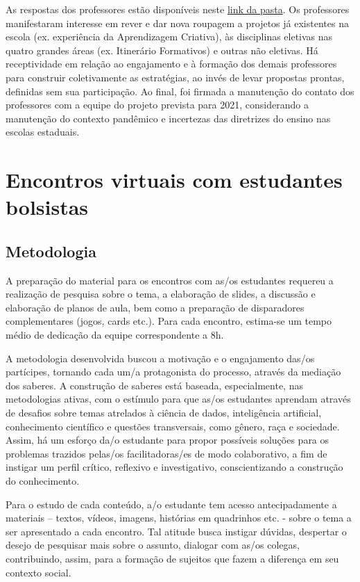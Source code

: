 \documentclass[
]{book}
\begin{document}
As respostas dos professores estão disponíveis neste \href{https://pad.riseup.net/p/CDnaEP}{link da pasta}.
Os professores manifestaram interesse em rever e dar nova roupagem a projetos já existentes na escola (ex. experiência da Aprendizagem Criativa), às disciplinas eletivas nas quatro grandes áreas (ex. Itinerário Formativos) e outras não eletivas. Há receptividade em relação ao engajamento e à formação dos demais professores para construir coletivamente as estratégias, ao invés de levar propostas prontas, definidas sem sua participação.
Ao final, foi firmada a manutenção do contato dos professores com a equipe do projeto prevista para 2021, considerando a manutenção do contexto pandêmico e incertezas das diretrizes do ensino nas escolas estaduais.

\hypertarget{encontros-virtuais-com-estudantes-bolsistas}{%
\chapter{Encontros virtuais com estudantes bolsistas}\label{encontros-virtuais-com-estudantes-bolsistas}}

\hypertarget{metodologia}{%
\section{Metodologia}\label{metodologia}}

A preparação do material para os encontros com as/os estudantes requereu a realização de pesquisa sobre o tema, a elaboração de slides, a discussão e elaboração de planos de aula, bem como a preparação de disparadores complementares (jogos, cards etc.). Para cada encontro, estima-se um tempo médio de dedicação da equipe correspondente a 8h.

A metodologia desenvolvida buscou a motivação e o engajamento das/os partícipes, tornando cada um/a protagonista do processo, através da mediação dos saberes. A construção de saberes está baseada, especialmente, nas metodologias ativas, com o estímulo para que as/os estudantes aprendam através de desafios sobre temas atrelados à ciência de dados, inteligência artificial, conhecimento científico e questões transversais, como gênero, raça e sociedade. Assim, há um esforço da/o estudante para propor possíveis soluções para os problemas trazidos pelas/os facilitadoras/es de modo colaborativo, a fim de instigar um perfil crítico, reflexivo e investigativo, conscientizando a construção do conhecimento.

Para o estudo de cada conteúdo, a/o estudante tem acesso antecipadamente a materiais -- textos, vídeos, imagens, histórias em quadrinhos etc. - sobre o tema a ser apresentado a cada encontro. Tal atitude busca instigar dúvidas, despertar o desejo de pesquisar mais sobre o assunto, dialogar com as/os colegas, contribuindo, assim, para a formação de sujeitos que fazem a diferença em seu contexto social.
\end{document}
